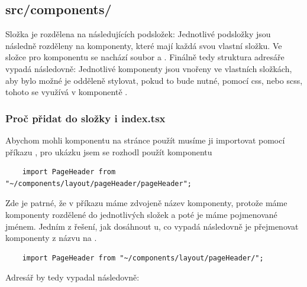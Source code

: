 \subsection{src/components/}
Složka je rozdělena na následujících podsložek:
\hfill \break
Jednotlivé podsložky jsou následně rozděleny na komponenty, které mají každá svou vlastní složku.
Ve složce pro komponentu se nachází soubor  a .
\hfill \break
Finálně tedy struktura adresáře vypadá následovně:
Jednotlivé komponenty jsou vnořeny ve vlastních složkách, aby bylo možné je odděleně stylovat, pokud to bude nutné, pomocí css, nebo scss, tohoto se využívá v komponentě .
\subsubsection{Proč přidat do složky i index.tsx}
Abychom mohli komponentu na stránce použít musíme ji importovat pomocí příkazu , pro ukázku jsem se rozhodl použít komponentu 
\begin{lstlisting}
    import PageHeader from "~/components/layout/pageHeader/pageHeader";
\end{lstlisting}
Zde je patrné, že v příkazu máme zdvojeně název komponenty, protože máme komponenty rozdělené do jednotlivých složek a poté je máme pojmenované jménem. Jedním z řešení, jak dosáhnout u, co vypadá následovně je přejmenovat komponenty z názvu na .
\begin{lstlisting}
    import PageHeader from "~/components/layout/pageHeader/";
\end{lstlisting}
Adresář by tedy vypadal následovně:

